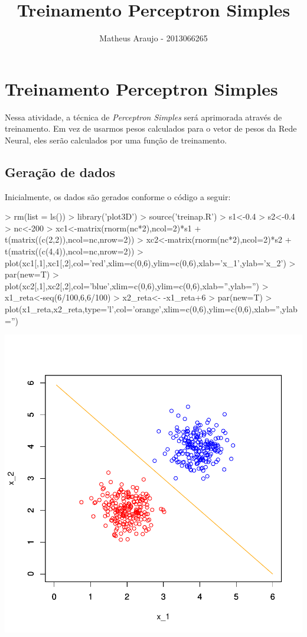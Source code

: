 \documentclass{article}
\begin{document}


\title{Treinamento Perceptron Simples}
\author{Matheus Araujo - 2013066265}
\date{}

\maketitle

\section{Treinamento Perceptron Simples}

Nessa atividade, a técnica de \emph{Perceptron Simples} será aprimorada através de treinamento. Em vez de usarmos pesos calculados para o vetor de pesos da Rede Neural, eles serão calculados por uma função de treinamento.

\subsection{Geração de dados}

Inicialmente, os dados são gerados conforme o código a seguir:

\begin{Schunk}
\begin{Sinput}
>   rm(list = ls())
>   library('plot3D')
>   source('treinap.R')
>   s1<-0.4
>   s2<-0.4
>   nc<-200
>   xc1<-matrix(rnorm(nc*2),ncol=2)*s1 + t(matrix((c(2,2)),ncol=nc,nrow=2))
>   xc2<-matrix(rnorm(nc*2),ncol=2)*s2 + t(matrix((c(4,4)),ncol=nc,nrow=2))
>   plot(xc1[,1],xc1[,2],col='red',xlim=c(0,6),ylim=c(0,6),xlab='x_1',ylab='x_2')
>   par(new=T)
>   plot(xc2[,1],xc2[,2],col='blue',xlim=c(0,6),ylim=c(0,6),xlab='',ylab='')
>   x1_reta<-seq(6/100,6,6/100)
>   x2_reta<- -x1_reta+6
>   par(new=T)
>   plot(x1_reta,x2_reta,type='l',col='orange',xlim=c(0,6),ylim=c(0,6),xlab='',ylab='')
\end{Sinput}
\end{Schunk}
\includegraphics{train_perceptron-001}
\end{document}
